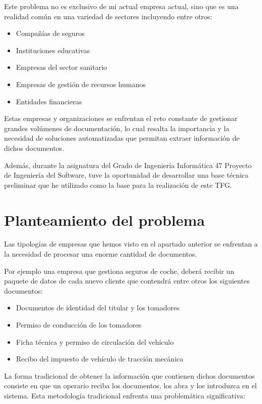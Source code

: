 Este problema no es exclusivo de mi actual empresa actual, sino que es una realidad común en una variedad de sectores
incluyendo entre otros:

\begin{itemize}
    \item Compañías de seguros
    \item Instituciones educativas
    \item Empresas del sector sanitario
    \item Empresas de gestión de recursos humanos
    \item Entidades financieras
\end{itemize}

Estas empresas y organizaciones se enfrentan el reto constante de gestionar grandes volúmenes de documentación, lo cual
resalta la importancia y la necesidad de soluciones automatizadas que permitan extraer información de dichos documentos.

Además, durante la asignatura del Grado de Ingeniería Informática 47 Proyecto de Ingeniería del Software, tuve la
oportunidad de desarrollar una base técnica preliminar que he utilizado como la base para la realización de este TFG\@.


\section{Planteamiento del problema}

Las tipologías de empresas que hemos visto en el apartado anterior se enfrentan a la necesidad de procesar una enorme
cantidad de documentos.

Por ejemplo una empresa que gestiona seguros de coche, deberá recibir un paquete de datos de cada nuevo cliente que
contendrá entre otros los siguientes documentos:

\begin{itemize}
    \item Documentos de identidad del titular y los tomadores
    \item Permiso de conducción de los tomadores
    \item Ficha técnica y permiso de circulación del vehículo
    \item Recibo del impuesto de vehículo de tracción mecánica
\end{itemize}

La forma tradicional de obtener la información que contienen dichos documentos consiste en que un operario reciba los
documentos, los abra y los introduzca en el sistema.
Esta metodología tradicional enfrenta una problemática significativa:

